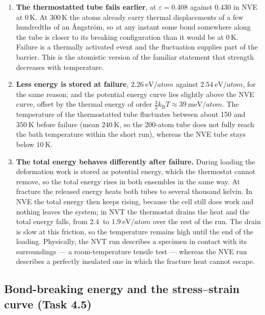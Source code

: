 \documentclass[11pt,a4paper]{article}
\numberwithin{equation}{section}
\theoremstyle{remark}
\newcommand{\kB}{k_{\mathrm{B}}}
\begin{document}
\begin{enumerate}\setlength{\itemsep}{3pt}
  \item \textbf{The thermostatted tube fails earlier}, at $\varepsilon = 0.408$ against $0.430$ in NVE
    at 0\,K. At 300\,K the atoms already carry thermal displacements of a few hundredths of an
    \AA ngstr\"om, so at any instant some bond somewhere along the tube is closer to its breaking
    configuration than it would be at 0\,K. Failure is a thermally activated event and the fluctuation
    supplies part of the barrier. This is the atomistic version of the familiar statement that strength
    decreases with temperature.
  \item \textbf{Less energy is stored at failure}, $\SI{2.26}{\electronvolt\per atom}$ against
    $\SI{2.54}{\electronvolt\per atom}$, for the same reason; and the potential energy curve lies
    slightly above the NVE curve, offset by the thermal energy of order
    $\tfrac32\kB T \approx \SI{39}{\milli\electronvolt\per atom}$. The temperature of the
    thermostatted tube fluctuates between about 150 and $\SI{350}{\kelvin}$ before failure (mean
    $\SI{240}{\kelvin}$, so the 200-atom tube does not fully reach the bath temperature within the short
    run), whereas the NVE tube stays below $\SI{10}{\kelvin}$.
  \item \textbf{The total energy behaves differently after failure.} During loading the deformation work
    is stored as potential energy, which the thermostat cannot remove, so the total energy rises in both
    ensembles in the same way. At fracture the released energy heats both tubes to several thousand
    kelvin. In NVE the total energy then keeps rising, because the cell still does work and nothing
    leaves the system; in NVT the thermostat drains the heat and the total energy falls, from
    $\SI{2.4}{}$ to $\SI{1.9}{\electronvolt\per atom}$ over the rest of the run. The drain is slow at this
    friction, so the temperature remains high until the end of the loading. Physically, the NVT run
    describes a specimen in contact with its surroundings --- a room-temperature tensile test --- whereas
    the NVE run describes a perfectly insulated one in which the fracture heat cannot escape.
\end{enumerate}

\subsection{Bond-breaking energy and the stress--strain curve (Task 4.5)}\label{sec:bond}
\end{document}
